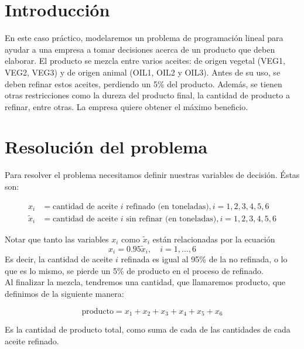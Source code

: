 \documentclass[12pt,a4paper,twoside,openright,titlepage,final]{article}
\author{José Ignacio Escribano}
\title{}
\begin{document}
\setcounter{page}{1}


\tableofcontents
\thispagestyle{empty}
\newpage


\setcounter{page}{1}

\section{Introducción}

En este caso práctico, modelaremos un problema de programación lineal para ayudar a una empresa a tomar decisiones acerca de un producto que deben elaborar. El producto se mezcla entre varios aceites: de origen vegetal (VEG1, VEG2, VEG3) y de origen animal (OIL1, OIL2 y OIL3). Antes de su uso, se deben refinar estos aceites, perdiendo un 5\% del producto. Además, se tienen otras restricciones como la dureza del producto final, la cantidad de producto a refinar, entre otras. La empresa quiere obtener el máximo beneficio.

\section{Resolución del problema}

Para resolver el problema necesitamos definir nuestras variables de decisión. Éstas son:

\begin{align*}
x_i & = \text{cantidad de aceite } i \text{ refinado (en toneladas)}, i=1,2,3,4,5,6 \\
\tilde{x}_i & = \text{cantidad de aceite } i \text{ sin refinar (en toneladas)}, i=1,2,3,4,5,6
\end{align*}

Notar que tanto las variables $x_i$ como $\tilde{x}_i$ están relacionadas por la ecuación 
\[x_i = 0.95\tilde{x}_i, \quad i=1,\dots,6 \]
Es decir, la cantidad de aceite $i$ refinada es igual al 95\% de la no refinada, o lo que es lo mismo, se pierde un 5\% de producto en el proceso de refinado.\\
 
Al finalizar la mezcla, tendremos una cantidad, que llamaremos producto, que definimos de la siguiente manera:

\[ \text{producto} = x_1 + x_2 + x_3 + x_4 + x_5 + x_6 \]

Es la cantidad de producto total, como suma de cada de las cantidades de cada aceite refinado.\\
\end{document}
